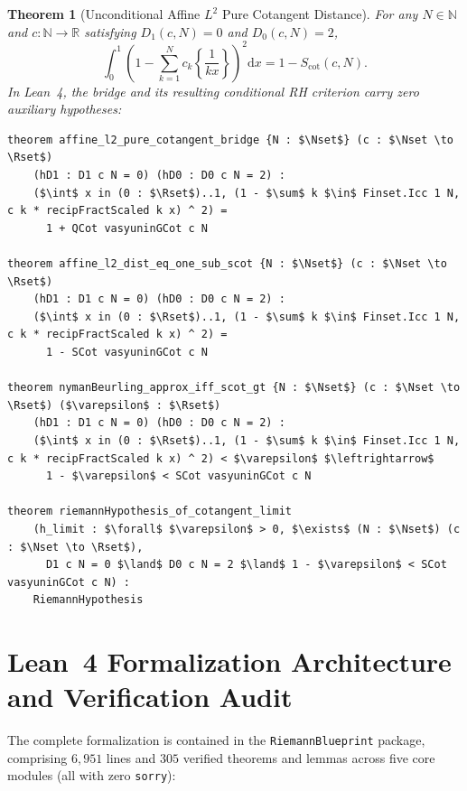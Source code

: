 \documentclass[11pt,a4paper]{article}
\newtheorem{theorem}{Theorem}[section]
\theoremstyle{definition}
\newcommand{\dee}{\mathrm{d}}
\newcommand{\Nset}{\mathbb{N}}
\newcommand{\Rset}{\mathbb{R}}
\begin{document}
\begin{theorem}[Unconditional Affine $L^2$ Pure Cotangent Distance]\label{thm:pure_cot_bridge}
For any $N \in \Nset$ and $c : \Nset \to \Rset$ satisfying $D_1(c, N) = 0$ and $D_0(c, N) = 2$,
\begin{equation}
\int_0^1 \left( 1 - \sum_{k=1}^N c_k \left\{ \frac{1}{k x} \right\} \right)^2 \dee x = 1 - S_{\mathrm{cot}}(c, N).
\end{equation}
In Lean~4, the bridge and its resulting conditional RH criterion carry zero auxiliary hypotheses:
\begin{lstlisting}
theorem affine_l2_pure_cotangent_bridge {N : $\Nset$} (c : $\Nset \to \Rset$)
    (hD1 : D1 c N = 0) (hD0 : D0 c N = 2) :
    ($\int$ x in (0 : $\Rset$)..1, (1 - $\sum$ k $\in$ Finset.Icc 1 N, c k * recipFractScaled k x) ^ 2) =
      1 + QCot vasyuninGCot c N

theorem affine_l2_dist_eq_one_sub_scot {N : $\Nset$} (c : $\Nset \to \Rset$)
    (hD1 : D1 c N = 0) (hD0 : D0 c N = 2) :
    ($\int$ x in (0 : $\Rset$)..1, (1 - $\sum$ k $\in$ Finset.Icc 1 N, c k * recipFractScaled k x) ^ 2) =
      1 - SCot vasyuninGCot c N

theorem nymanBeurling_approx_iff_scot_gt {N : $\Nset$} (c : $\Nset \to \Rset$) ($\varepsilon$ : $\Rset$)
    (hD1 : D1 c N = 0) (hD0 : D0 c N = 2) :
    ($\int$ x in (0 : $\Rset$)..1, (1 - $\sum$ k $\in$ Finset.Icc 1 N, c k * recipFractScaled k x) ^ 2) < $\varepsilon$ $\leftrightarrow$
      1 - $\varepsilon$ < SCot vasyuninGCot c N

theorem riemannHypothesis_of_cotangent_limit
    (h_limit : $\forall$ $\varepsilon$ > 0, $\exists$ (N : $\Nset$) (c : $\Nset \to \Rset$),
      D1 c N = 0 $\land$ D0 c N = 2 $\land$ 1 - $\varepsilon$ < SCot vasyuninGCot c N) :
    RiemannHypothesis
\end{lstlisting}
\end{theorem}

\section{Lean~4 Formalization Architecture and Verification Audit}

The complete formalization is contained in the \texttt{RiemannBlueprint} package, comprising $6{,}951$ lines and $305$ verified theorems and lemmas across five core modules (all with zero \texttt{sorry}):
\end{document}
